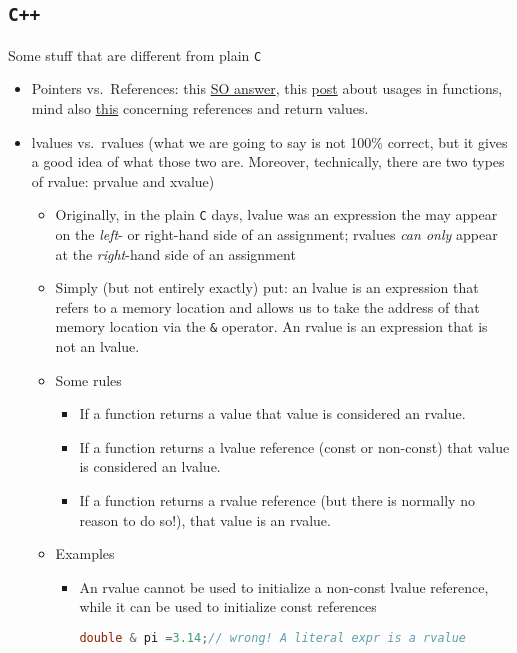 \documentclass[a4paper,12pt,%
              final%
              ]{article}
\begin{document}
\subsection{\texttt{C++}}
Some stuff that are different from plain \texttt{C}
\begin{itemize}
  \item Pointers vs.~References: this \href{https://stackoverflow.com/a/57492/12152457}{SO answer}, this \href{https://www.geeksforgeeks.org/when-do-we-pass-arguments-by-reference-or-pointer/}{post} about usages in functions, mind also \href{https://www.tutorialspoint.com/cplusplus/returning_values_by_reference.htm}{this} concerning references and return values.
  \item lvalues vs.~rvalues (what we are going to say is not 100\% correct, but it gives a good idea of what those two are. Moreover, technically, there are two types of rvalue: prvalue and xvalue)
    \begin{itemize}
      \item Originally, in the plain \texttt{C} days, lvalue was an expression the may appear on the \emph{left}- or right-hand side of an assignment; rvalues \emph{can only} appear at the \emph{right}-hand side of an assignment
      \item Simply (but not entirely exactly) put: an lvalue is an expression that refers to a memory location and allows us to take the address of that memory location via the \verb|&| operator. An rvalue is an expression that is not an lvalue.
      \item Some rules
        \begin{itemize}
          \item If a function returns a value that value is considered an rvalue.
          \item If a function returns a lvalue reference (const or non-const) that value is considered an lvalue.
          \item If a function returns a rvalue reference (but there is normally no reason to do so!), that value is an rvalue.
        \end{itemize}
      \item Examples
        \begin{itemize}
          \item An rvalue cannot be used to initialize a non-const lvalue reference, while it can be used to initialize const references
            \begin{lstlisting}[language=C++]
double & pi =3.14;// wrong! A literal expr is a rvalue

\end{lstlisting}
\end{itemize}
\end{itemize}
\end{itemize}
\end{document}
